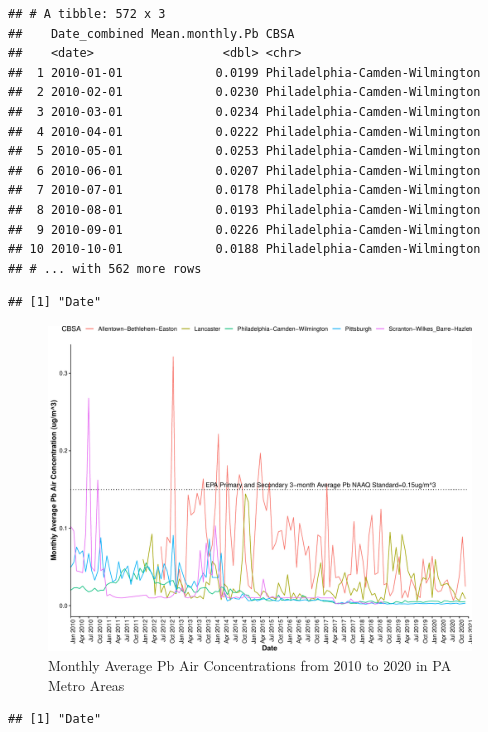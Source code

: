 \documentclass[
  12pt,
]{article}
\begin{document}
\begin{verbatim}
## # A tibble: 572 x 3
##    Date_combined Mean.monthly.Pb CBSA                          
##    <date>                  <dbl> <chr>                         
##  1 2010-01-01             0.0199 Philadelphia-Camden-Wilmington
##  2 2010-02-01             0.0230 Philadelphia-Camden-Wilmington
##  3 2010-03-01             0.0234 Philadelphia-Camden-Wilmington
##  4 2010-04-01             0.0222 Philadelphia-Camden-Wilmington
##  5 2010-05-01             0.0253 Philadelphia-Camden-Wilmington
##  6 2010-06-01             0.0207 Philadelphia-Camden-Wilmington
##  7 2010-07-01             0.0178 Philadelphia-Camden-Wilmington
##  8 2010-08-01             0.0193 Philadelphia-Camden-Wilmington
##  9 2010-09-01             0.0226 Philadelphia-Camden-Wilmington
## 10 2010-10-01             0.0188 Philadelphia-Camden-Wilmington
## # ... with 562 more rows
\end{verbatim}

\begin{verbatim}
## [1] "Date"
\end{verbatim}

\begin{figure}

\includegraphics{Alcorn_Bao_Hermanson_ENV872_Project_files/figure-latex/time-series-visuals-1} \hfill{}

\caption{Monthly Average Pb Air Concentrations from 2010 to 2020 in PA Metro Areas}\label{fig:time-series-visuals}
\end{figure}

\begin{verbatim}
## [1] "Date"
\end{verbatim}
\end{document}
